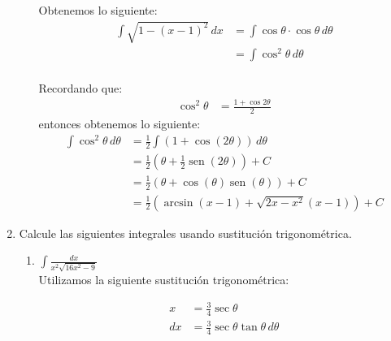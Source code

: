 \documentclass[a4paper,10pt]{article}
\newcommand{\dis}{\displaystyle}
\def\sin{\operatorname{sen}}
\begin{document}
\begin{enumerate}
\begin{enumerate}[label=\emph{\alph*)}]
\begin{minipage}{.3\textwidth}
\end{minipage}

Obtenemos lo siguiente:
\begin{align*}
 \dis \int \sqrt{1 - (x-1)^2}\, dx  &=    \dis \int \cos \theta \cdot \cos \theta  \, d\theta\\
 									&=	 \dis \int \cos^2 \theta \, d\theta\\
\end{align*}
\dotfill [1 punto]

Recordando que:
\begin{align*}
 \dis \cos^2 \theta  &= \frac{1+\cos 2\theta}{2}
\end{align*}
entonces obtenemos lo siguiente:
\begin{align*}
 \dis \int \cos^2 \theta  \, d\theta   &= \frac{1}{2}\dis \int (1+\cos(2\theta))  \, d\theta \\
 									   &= \frac{1}{2} \left( \theta + \frac{1}{2}\sin(2\theta) \right)+C\\
                                       &= \frac{1}{2} \left( \theta + \cos(\theta)\sin(\theta) \right)+C\\
                                       &= \frac{1}{2} \left( \arcsin(x-1) + \sqrt{2x-x^2}(x-1) \right)+C
\end{align*}

\end{enumerate}
\dotfill [1 punto]

\newpage
\item Calcule las siguientes integrales usando sustituci\'{o}n
trigonom\'{e}trica.
\begin{enumerate}[label=\emph{\alph*)}]
\item $\dis \int \frac{dx}{x^2\sqrt{16x^2-9}} $\\

Utilizamos la siguiente sustitución trigonométrica:\\

\begin{minipage}{.3\textwidth}
\raggedright
\begin{align*}
x  &= \frac{3}{4} \sec \theta      \\
dx &= \frac{3}{4} \sec \theta \tan \theta  \, d\theta
\end{align*}
\end{minipage}%
\begin{minipage}{.3\textwidth}
\raggedleft
{}
\end{minipage}
\end{enumerate}
\end{enumerate}
\end{document}
